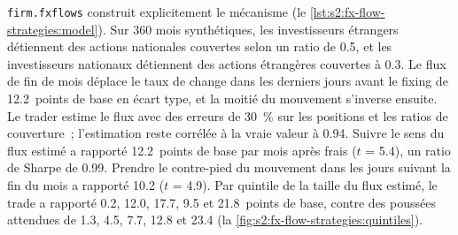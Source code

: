 \begin{omfigure}

\label{fig:s2:fx-flow-strategies:real}
\end{omfigure}

\texttt{firm.fxflows} construit explicitement le mécanisme (le \cref{lst:s2:fx-flow-strategies:model}). Sur 360 mois synthétiques, les investisseurs étrangers détiennent des actions nationales
couvertes selon un ratio de 0.5, et les investisseurs nationaux détiennent des actions étrangères couvertes à 0.3. Le flux de fin de mois déplace le taux de change dans les derniers jours
avant le fixing de 12.2~points de base en écart type, et la moitié du mouvement s'inverse ensuite. Le trader estime le flux avec des erreurs de 30~\% sur les
positions et les ratios de couverture~; l'estimation reste corrélée à la vraie valeur à 0.94. Suivre le sens du flux estimé a rapporté 12.2~points de base par
mois après frais ($t$ = 5.4), un ratio de Sharpe de 0.99. Prendre le contre-pied du mouvement dans les jours suivant la fin du mois a rapporté 10.2 ($t$ = 4.9). Par quintile de la taille du flux estimé,
le trade a rapporté 0.2, 12.0, 17.7, 9.5 et 21.8~points de base, contre des poussées attendues de 1.3, 4.5, 7.7, 12.8 et 23.4
(la \cref{fig:s2:fx-flow-strategies:quintiles}).

